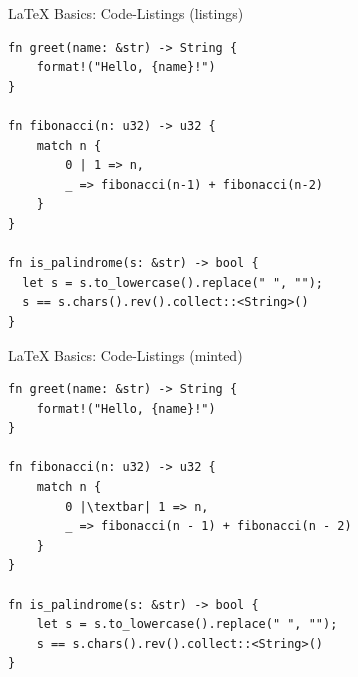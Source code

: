 \documentclass[main.tex]{subfiles}
\begin{document}
\begin{frame}[fragile]{\LaTeX{} Basics: Code-Listings (listings)}
	\begin{lstlisting}
fn greet(name: &str) -> String {
    format!("Hello, {name}!")
}

fn fibonacci(n: u32) -> u32 {
    match n {
        0 | 1 => n,
        _ => fibonacci(n-1) + fibonacci(n-2)
    }
}

fn is_palindrome(s: &str) -> bool {
  let s = s.to_lowercase().replace(" ", "");
  s == s.chars().rev().collect::<String>()
}
    \end{lstlisting}
\end{frame}

\begin{frame}[fragile]{\LaTeX{} Basics: Code-Listings (minted)}
	\begin{verbatim}
fn greet(name: &str) -> String {
    format!("Hello, {name}!")
}

fn fibonacci(n: u32) -> u32 {
    match n {
        0 |\textbar| 1 => n,
        _ => fibonacci(n - 1) + fibonacci(n - 2)
    }
}

fn is_palindrome(s: &str) -> bool {
    let s = s.to_lowercase().replace(" ", "");
    s == s.chars().rev().collect::<String>()
}
    \end{verbatim}
\end{frame}
\end{document}
